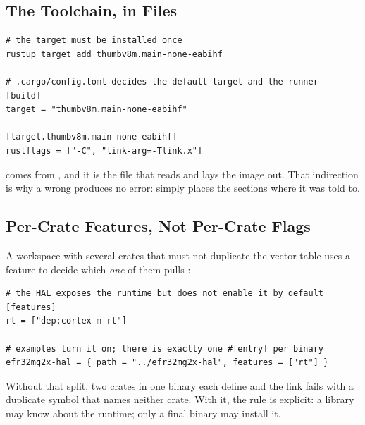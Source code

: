 \subsection{The Toolchain, in Files}

\begin{verbatim}
# the target must be installed once
rustup target add thumbv8m.main-none-eabihf

# .cargo/config.toml decides the default target and the runner
[build]
target = "thumbv8m.main-none-eabihf"

[target.thumbv8m.main-none-eabihf]
rustflags = ["-C", "link-arg=-Tlink.x"]
\end{verbatim}

 comes from , and it is the file that reads
 and lays the image out. That indirection is why a wrong 
produces no error:  simply places the sections where it was told to.

\subsection{Per-Crate Features, Not Per-Crate Flags}

A workspace with several crates that must not duplicate the vector table uses a feature to decide
which \emph{one} of them pulls :

\begin{verbatim}
# the HAL exposes the runtime but does not enable it by default
[features]
rt = ["dep:cortex-m-rt"]

# examples turn it on; there is exactly one #[entry] per binary
efr32mg2x-hal = { path = "../efr32mg2x-hal", features = ["rt"] }
\end{verbatim}

Without that split, two crates in one binary each define  and the link fails with a
duplicate symbol that names neither crate. With it, the rule is explicit: a library may know about
the runtime; only a final binary may install it.
